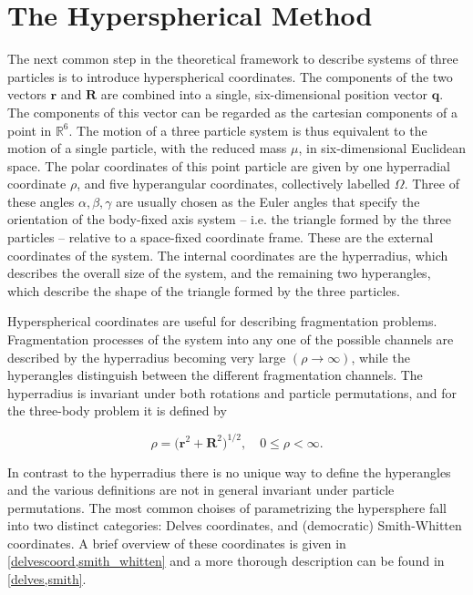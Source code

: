\section{The Hyperspherical Method}
The next common step in the theoretical framework to describe systems of three particles is to introduce hyperspherical coordinates. The components of the two vectors $\mathbf{r}$ and $\mathbf{R}$ are combined into a single, six-dimensional position vector $\mathbf{q}$. The components of this vector can be regarded as the cartesian components of a point in $\mathbb{R}^{6}$. The motion of a three particle system is thus equivalent to the motion of a single particle, with the reduced mass $\mu$, in six-dimensional Euclidean space. The polar coordinates of this point particle are given by one hyperradial coordinate $\rho$, and five hyperangular coordinates, collectively labelled $\Omega$. Three of these angles $\alpha, \beta, \gamma$ are usually chosen as the Euler angles that specify the  orientation of the body-fixed axis system -- i.e. the triangle formed by the three particles -- relative to a space-fixed coordinate frame. These are the external coordinates of the system. The internal coordinates are the hyperradius, which describes the overall size of the system, and the remaining two hyperangles, which describe the shape of the triangle formed by the  three particles. 

Hyperspherical coordinates are useful for describing fragmentation problems. Fragmentation processes of the system into any one of the possible channels are described by the hyperradius becoming very large $(\rho \rightarrow \infty)$, while the hyperangles distinguish between the different fragmentation channels. The hyperradius is invariant under both rotations and particle permutations, and for the three-body problem it is defined by

\begin{equation}
\rho = \Big(\mathbf{r}^{2} + \mathbf{R}^{2}\Big)^{1/2}, \quad 0\leq \rho < \infty.
\end{equation} 

In contrast to the hyperradius there is no unique way to define the hyperangles and the various definitions are not in general invariant under particle permutations. The most common choises of parametrizing the hypersphere fall into two distinct categories: Delves coordinates, and (democratic) Smith-Whitten coordinates. A brief overview of these coordinates is given in \cref{delvescoord,smith_whitten} and a more thorough description can be found in \cref{delves,smith}.

